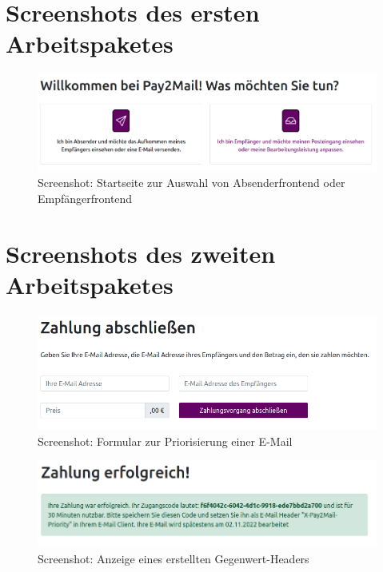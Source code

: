 \newpage
\section{Screenshots des ersten Arbeitspaketes}

\begin{figure}[!h]
	\centering
		\includegraphics[width=1\textwidth]{Figures/overview.png}
	\caption{Screenshot: Startseite zur Auswahl von Absenderfrontend oder Empfängerfrontend}
	\label{fig:screenshot_overview}
\end{figure}

\newpage
\section{Screenshots des zweiten Arbeitspaketes}

\begin{figure}[!h]
	\centering
		\includegraphics[width=1\textwidth]{Figures/send_priority_new.png}
	\caption{Screenshot: Formular zur Priorisierung einer E-Mail}
	\label{fig:screenshot_send/priority_new}
\end{figure}

\begin{figure}[!h]
	\centering
		\includegraphics[width=1\textwidth]{Figures/send_priority_show.png}
	\caption{Screenshot: Anzeige eines erstellten Gegenwert-Headers}
	\label{fig:screenshot_send/priority_show}
\end{figure}

